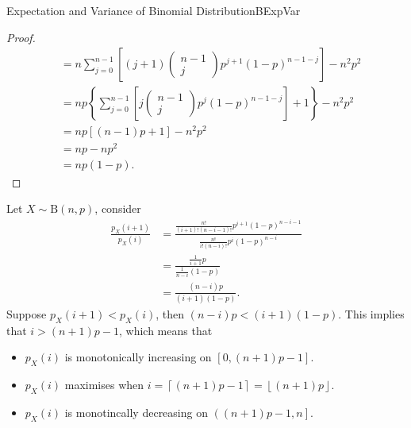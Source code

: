 \documentclass[math]{amznotes}
\theoremstyle{remark}
\begin{document}
\begin{thmbox}{Expectation and Variance of Binomial Distribution}{BExpVar}
\begin{proof}
\begin{align*}
            & = n\sum_{j = 0}^{n - 1}\left[(j + 1)\begin{pmatrix}
                n - 1 \\
                j
            \end{pmatrix}p^{j + 1}(1 - p)^{n - 1 - j}\right] - n^2p^2 \\
            & = np\left\{\sum_{j = 0}^{n - 1}\left[j\begin{pmatrix}
                n - 1 \\
                j
            \end{pmatrix}p^j(1 - p)^{n - 1 - j}\right] + 1\right\} - n^2p^2 \\
            & = np\left[(n - 1)p + 1\right] - n^2p^2 \\
            & = np - np^2 \\
            & = np(1 - p).
        \end{align*}
    \end{proof}
\end{thmbox}
Let $X \sim \mathrm{B}(n, p)$, consider
\begin{align*}
    \frac{p_X(i + 1)}{p_X(i)} & = \frac{\frac{n!}{(i + 1)!(n - i - 1)!}p^{i + 1}(1 - p)^{n - i - 1}}{\frac{n!}{i!(n - i)!}p^i(1 - p)^{n - i}} \\
    & = \frac{\frac{1}{i + 1}p}{\frac{1}{n - i}(1 - p)} \\
    & = \frac{(n - i)p}{(i + 1)(1 - p)}.
\end{align*}
Suppose $p_X(i + 1) < p_X(i)$, then $(n - i)p < (i + 1)(1 - p)$. This implies that $i > (n + 1)p - 1$, which means that
\begin{itemize}
    \item $p_X(i)$ is monotonically increasing on $\left[0, (n + 1)p - 1\right]$.
    \item $p_X(i)$ maximises when $i = \left\lceil (n + 1)p - 1 \right\rceil = \left\lfloor (n + 1)p \right\rfloor$.
    \item $p_X(i)$ is monotincally decreasing on $\left((n + 1)p - 1, n\right]$.
\end{itemize}
\end{document}
